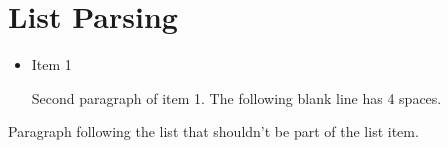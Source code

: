 
\def\mytitle{MMD List Parsing Test}


\part{List Parsing}
\label{listparsing}

\begin{itemize}
\item Item 1

Second paragraph of item 1.
The following blank line has 4 spaces.

\end{itemize}

Paragraph following the list that shouldn't be part of the list item.





